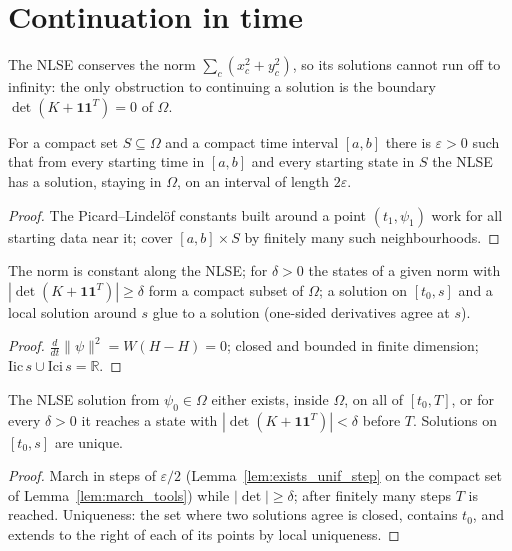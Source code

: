\section{Continuation in time}

The NLSE conserves the norm $\sum_c(x_c^2+y_c^2)$, so its solutions cannot run off to infinity: the only obstruction
to continuing a solution is the boundary $\det(K+\mathbf 1\mathbf 1^T)=0$ of $\Omega$.

\begin{lemma}
  \label{lem:exists_unif_step}
  \leanok
  For a compact set $S\subseteq\Omega$ and a compact time interval $[a,b]$ there is $\varepsilon>0$ such that from
  every starting time in $[a,b]$ and every starting state in $S$ the NLSE has a solution, staying in $\Omega$, on
  an interval of length $2\varepsilon$.
\end{lemma}
\begin{proof}
  \leanok
  The Picard--Lindel\"of constants built around a point $(t_1,\psi_1)$ work for all starting data near it; cover
  $[a,b]\times S$ by finitely many such neighbourhoods.
\end{proof}

\begin{lemma}
  \label{lem:march_tools}
  \leanok
  The norm is constant along the NLSE; for $\delta>0$ the states of a given norm with $|\det(K+\mathbf 1\mathbf 1^T)|
  \ge\delta$ form a compact subset of $\Omega$; a solution on $[t_0,s]$ and a local solution around $s$ glue to a
  solution (one-sided derivatives agree at $s$).
\end{lemma}
\begin{proof}
  \leanok
  $\frac{d}{dt}\|\psi\|^2=W(H-H)=0$; closed and bounded in finite dimension; $\mathrm{Iic}\,s\cup\mathrm{Ici}\,s=\mathbb R$.
\end{proof}

\begin{theorem}
  \label{thm:nlse_global}
  \leanok
  The NLSE solution from $\psi_0\in\Omega$ either exists, inside $\Omega$, on all of $[t_0,T]$, or for every $\delta>0$
  it reaches a state with $|\det(K+\mathbf 1\mathbf 1^T)|<\delta$ before $T$. Solutions on $[t_0,s]$ are unique.
\end{theorem}
\begin{proof}
  \leanok
  March in steps of $\varepsilon/2$ (Lemma~\ref{lem:exists_unif_step} on the compact set of
  Lemma~\ref{lem:march_tools}) while $|\det|\ge\delta$; after finitely many steps $T$ is reached. Uniqueness: the set
  where two solutions agree is closed, contains $t_0$, and extends to the right of each of its points by local
  uniqueness.
\end{proof}

